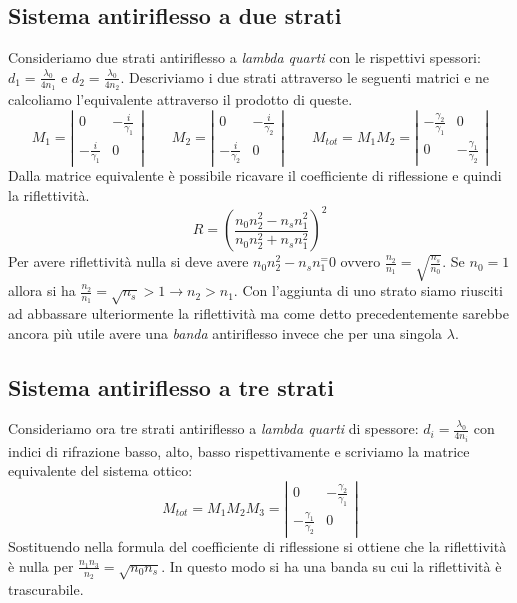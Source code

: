 \documentclass{article}
\begin{document}
\subsection{Sistema antiriflesso a due strati}
Consideriamo due strati antiriflesso a \textit{lambda quarti} con le rispettivi spessori: $d_1 = \frac{\lambda_0}{4n_1}$ e $d_2 = \frac{\lambda_0}{4n_2}$.
Descriviamo i due strati attraverso le seguenti matrici e ne calcoliamo l'equivalente attraverso il prodotto di queste.
\[
M_1 = \left| \begin{array}{cc}
0 & -\frac{i}{\gamma_1} \\
-\frac{i}{\gamma_1} & 0
\end{array} \right|
\qquad
M_2 = \left| \begin{array}{cc}
0 & -\frac{i}{\gamma_2} \\
-\frac{i}{\gamma_2} & 0
\end{array} \right|
\qquad
M_{tot} = M_1 M_2 = \left| \begin{array}{cc}
-\frac{\gamma_2}{\gamma_1} & 0 \\
0 & -\frac{\gamma_1}{\gamma_2}
\end{array} \right|
\]
Dalla matrice equivalente è possibile ricavare il coefficiente di riflessione e quindi la riflettività.
\begin{equation}
R = \left( \frac{n_0 n_2^2 - n_s n_1^2}{n_0 n_2^2 + n_s n_1^2} \right)^2
\end{equation}
Per avere riflettività nulla si deve avere $n_0 n_2^2 - n_s n_1^ = 0$ ovvero $\frac{n_2}{n_1} = \sqrt{\frac{n_s}{n_0}}$. Se $n_0 = 1$ allora si ha $\frac{n_2}{n_1} = \sqrt{n_s} > 1 \rightarrow n_2 > n_1$. Con l'aggiunta di uno strato siamo riusciti ad abbassare ulteriormente la riflettività ma come detto precedentemente sarebbe ancora più utile avere una \textit{banda} antiriflesso invece che per una singola $\lambda$.

\subsection{Sistema antiriflesso a tre strati}
Consideriamo ora tre strati antiriflesso a \textit{lambda quarti} di spessore: $d_i = \frac{\lambda_0}{4n_i}$ con indici di rifrazione basso, alto, basso rispettivamente e scriviamo la matrice equivalente del sistema ottico:
\[
M_{tot} = M_1 M_2 M_3 = \left| \begin{array}{cc}
0 & -\frac{\gamma_2}{\gamma_1} \\
-\frac{\gamma_1}{\gamma_2} & 0
\end{array} \right|
\]
Sostituendo nella formula del coefficiente di riflessione si ottiene che la riflettività è nulla per $\frac{n_1 n_3}{n_2} = \sqrt{n_0 n_s}$.
In questo modo si ha una banda su cui la riflettività è trascurabile.
\end{document}
